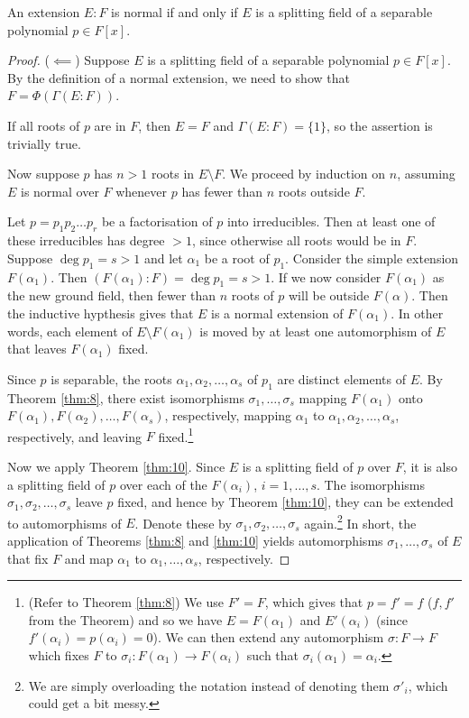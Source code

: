 \begin{theorem}\label{thm:15}
	An extension $E : F$ is normal if and only if $E$ is a splitting field of a separable polynomial $p \in F[x]$.
	\begin{proof}
		($\impliedby$) Suppose $E$ is a splitting field of a separable polynomial $p \in F[x]$. By the definition of a normal extension, we need to show that $F = \Phi(\Gamma(E : F))$.
		
		If all roots of $p$ are in $F$, then $E = F$ and $\Gamma(E : F) = \{1\}$, so the assertion is trivially true.
		
		Now suppose $p$ has $n > 1$ roots in $E \setminus F$. We proceed by induction on $n$, assuming $E$ is normal over $F$ whenever $p$ has fewer than $n$ roots outside $F$.
		
		Let $p = p_1 p_2 \dots p_r$ be a factorisation of $p$ into irreducibles. Then at least one of these irreducibles has degree $> 1$, since otherwise all roots would be in $F$. Suppose $\deg{p_1} = s > 1$ and let $\alpha_1$ be a root of $p_1$. Consider the simple extension $F(\alpha_1)$. Then $(F(\alpha_1) : F) = \deg{p_1} = s > 1$. If we now consider $F(\alpha_1)$ as the new ground field, then fewer than $n$ roots of $p$ will be outside $F(\alpha)$. Then the inductive hypthesis gives that $E$ is a normal extension of $F(\alpha_1)$. In other words, each element of $E \setminus F(\alpha_1)$ is moved by at least one automorphism of $E$ that leaves $F(\alpha_1)$ fixed.
		
		Since $p$ is separable, the roots $\alpha_1, \alpha_2, \dots, \alpha_s$ of $p_1$ are distinct elements of $E$. By Theorem \ref{thm:8}, there exist isomorphisms $\sigma_1, \dots, \sigma_s$ mapping $F(\alpha_1)$ onto $F(\alpha_1), F(\alpha_2), \dots, F(\alpha_s)$, respectively, mapping $\alpha_1$ to $\alpha_1, \alpha_2, \dots, \alpha_s$, respectively, and leaving $F$ fixed.\footnote{(Refer to Theorem \ref{thm:8}) We use $F' = F$, which gives that $p = f' = f$ ($f, f'$ from the Theorem) and so we have $E = F(\alpha_1)$ and $E'(\alpha_i)$ (since $f'(\alpha_i) = p(\alpha_i) = 0$). We can then extend any automorphism $\sigma : F \to F$ which fixes $F$ to $\sigma_i : F(\alpha_1) \to F(\alpha_i)$ such that $\sigma_i(\alpha_1) = \alpha_i$.}
		
		Now we apply Theorem \ref{thm:10}. Since $E$ is a splitting field of $p$ over $F$, it is also a splitting field of $p$ over each of the $F(\alpha_i)$, $i = 1, \dots, s$. The isomorphisms $\sigma_1, \sigma_2, \dots, \sigma_s$ leave $p$ fixed, and hence by Theorem \ref{thm:10}, they can be extended to automorphisms of $E$. Denote these by $\sigma_1, \sigma_2, \dots, \sigma_s$ again.\footnote{We are simply overloading the notation instead of denoting them $\sigma'_i$, which could get a bit messy.} In short, the application of Theorems \ref{thm:8} and \ref{thm:10} yields automorphisms $\sigma_1, \dots, \sigma_s$ of $E$ that fix $F$ and map $\alpha_1$ to $\alpha_1, \dots, \alpha_s$, respectively.
		

\end{proof}
\end{theorem}
